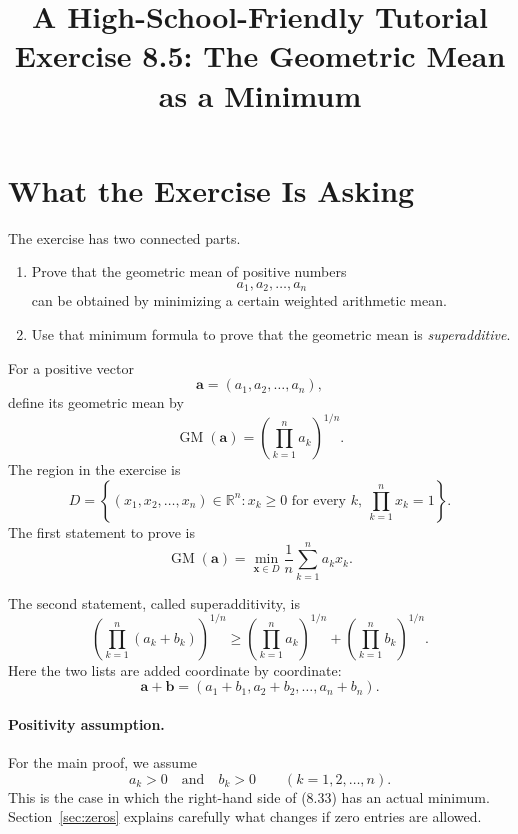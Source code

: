 \documentclass[11pt]{article}
\title{A High-School-Friendly Tutorial\\[0.25em]
Exercise 8.5: The Geometric Mean as a Minimum}
\author{}
\date{}
\newcommand{\R}{\mathbb{R}}
\newcommand{\GM}{\operatorname{GM}}
\begin{document}
\maketitle
\tableofcontents
\bigskip

\section{What the Exercise Is Asking}

The exercise has two connected parts.

\begin{enumerate}
\item Prove that the geometric mean of positive numbers
\[
 a_1,a_2,\ldots,a_n
\]
can be obtained by minimizing a certain weighted arithmetic mean.

\item Use that minimum formula to prove that the geometric mean is
\emph{superadditive}.
\end{enumerate}

For a positive vector
\[
 \mathbf a=(a_1,a_2,\ldots,a_n),
\]
define its geometric mean by
\[
 \GM(\mathbf a)
 =\left(\prod_{k=1}^{n}a_k\right)^{1/n}.
\]
The region in the exercise is
\[
 D=
 \left\{
 (x_1,x_2,\ldots,x_n)\in\R^n:
 x_k\ge 0\text{ for every }k,
 \ \prod_{k=1}^{n}x_k=1
 \right\}.
\]
The first statement to prove is
\begin{equation*}
\boxed{
 \GM(\mathbf a)
 =
 \min_{\mathbf x\in D}
 \frac1n\sum_{k=1}^{n}a_kx_k.
}
\tag{8.33}
\end{equation*}

The second statement, called superadditivity, is
\begin{equation*}
\boxed{
 \left(\prod_{k=1}^{n}(a_k+b_k)\right)^{1/n}
 \ge
 \left(\prod_{k=1}^{n}a_k\right)^{1/n}
 +
 \left(\prod_{k=1}^{n}b_k\right)^{1/n}.
}
\tag{SA}
\end{equation*}
Here the two lists are added coordinate by coordinate:
\[
 \mathbf a+\mathbf b
 =(a_1+b_1,a_2+b_2,\ldots,a_n+b_n).
\]

\paragraph{Positivity assumption.}
For the main proof, we assume
\[
 a_k>0\quad\text{and}\quad b_k>0
 \qquad(k=1,2,\ldots,n).
\]
This is the case in which the right-hand side of (8.33) has an actual
minimum.  Section~\ref{sec:zeros} explains carefully what changes if zero
entries are allowed.
\end{document}
